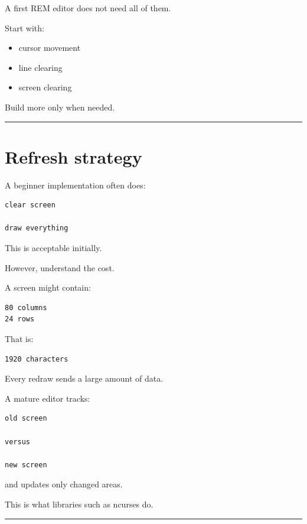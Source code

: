 \documentclass[
  oneside,
  openany]{book}
\providecommand{\tightlist}{%
  \setlength{\itemsep}{0pt}\setlength{\parskip}{0pt}}
\begin{document}
A first REM editor does not need all of them.

Start with:

\begin{itemize}
\tightlist
\item
  cursor movement
\item
  line clearing
\item
  screen clearing
\end{itemize}

Build more only when needed.

\begin{center}\rule{0.5\linewidth}{0.5pt}\end{center}

\hypertarget{refresh-strategy}{%
\section{Refresh strategy}\label{refresh-strategy}}

A beginner implementation often does:

\begin{verbatim}
clear screen

draw everything
\end{verbatim}

This is acceptable initially.

However, understand the cost.

A screen might contain:

\begin{verbatim}
80 columns
24 rows
\end{verbatim}

That is:

\begin{verbatim}
1920 characters
\end{verbatim}

Every redraw sends a large amount of data.

A mature editor tracks:

\begin{verbatim}
old screen

versus

new screen
\end{verbatim}

and updates only changed areas.

This is what libraries such as ncurses do.

\begin{center}\rule{0.5\linewidth}{0.5pt}\end{center}
\end{document}
